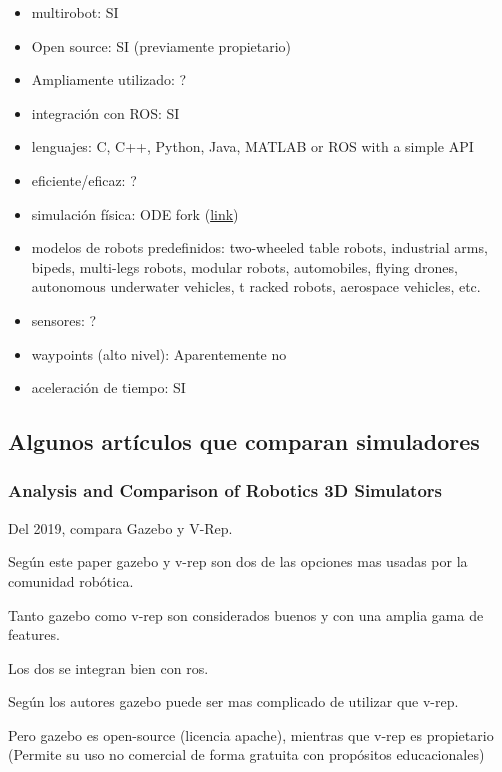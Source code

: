 \begin{itemize}
\begin{itemize}
    \item multirobot:                     SI
    \item Open source:                    SI (previamente propietario)
    \item Ampliamente utilizado:          ?
    \item integración con ROS:            SI
    \item lenguajes:                      C, C++, Python, Java, MATLAB or ROS with a simple API
    \item eficiente/eficaz:               ?
    \item simulación física:              ODE fork (\href{https://www.reddit.com/r/robotics/comments/hhz5nn/how_does_the_accuracy_of_the_dynamics_of_webots/}{link})
    \item modelos de robots predefinidos: two-wheeled table robots, industrial arms, bipeds, multi-legs robots, modular robots, automobiles, flying drones, autonomous underwater vehicles, t
                                      racked robots, aerospace vehicles, etc.  
    \item sensores:                       ?
    \item waypoints (alto nivel):         Aparentemente no 
    \item aceleración de tiempo:          SI
  \end{itemize}
\end{itemize}

\subsection{Algunos artículos que comparan simuladores}
\subsubsection{Analysis and Comparison of Robotics 3D Simulators}

Del 2019, compara Gazebo y V-Rep.

Según este paper gazebo y v-rep son dos de las opciones mas usadas por la comunidad robótica.

Tanto gazebo como v-rep son considerados buenos y con una amplia gama de features.

Los dos se integran bien con ros.

Según los autores gazebo puede ser mas complicado de utilizar que v-rep. 

Pero gazebo es open-source (licencia apache), mientras que v-rep es propietario (Permite su uso no comercial de forma gratuita con propósitos educacionales)

